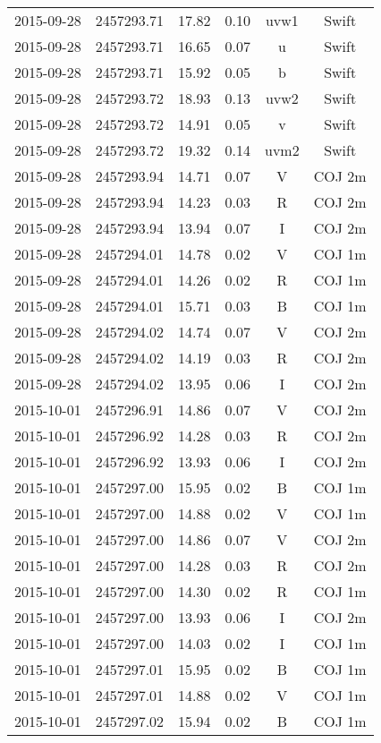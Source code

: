 \begin{table}
\begin{tabular}{cccccc}
2015-09-28 & 2457293.71 & 17.82 & 0.10 & uvw1 & Swift \\
2015-09-28 & 2457293.71 & 16.65 & 0.07 & u & Swift \\
2015-09-28 & 2457293.71 & 15.92 & 0.05 & b & Swift \\
2015-09-28 & 2457293.72 & 18.93 & 0.13 & uvw2 & Swift \\
2015-09-28 & 2457293.72 & 14.91 & 0.05 & v & Swift \\
2015-09-28 & 2457293.72 & 19.32 & 0.14 & uvm2 & Swift \\
2015-09-28 & 2457293.94 & 14.71 & 0.07 & V & COJ 2m \\
2015-09-28 & 2457293.94 & 14.23 & 0.03 & R & COJ 2m \\
2015-09-28 & 2457293.94 & 13.94 & 0.07 & I & COJ 2m \\
2015-09-28 & 2457294.01 & 14.78 & 0.02 & V & COJ 1m \\
2015-09-28 & 2457294.01 & 14.26 & 0.02 & R & COJ 1m \\
2015-09-28 & 2457294.01 & 15.71 & 0.03 & B & COJ 1m \\
2015-09-28 & 2457294.02 & 14.74 & 0.07 & V & COJ 2m \\
2015-09-28 & 2457294.02 & 14.19 & 0.03 & R & COJ 2m \\
2015-09-28 & 2457294.02 & 13.95 & 0.06 & I & COJ 2m \\
2015-10-01 & 2457296.91 & 14.86 & 0.07 & V & COJ 2m \\
2015-10-01 & 2457296.92 & 14.28 & 0.03 & R & COJ 2m \\
2015-10-01 & 2457296.92 & 13.93 & 0.06 & I & COJ 2m \\
2015-10-01 & 2457297.00 & 15.95 & 0.02 & B & COJ 1m \\
2015-10-01 & 2457297.00 & 14.88 & 0.02 & V & COJ 1m \\
2015-10-01 & 2457297.00 & 14.86 & 0.07 & V & COJ 2m \\
2015-10-01 & 2457297.00 & 14.28 & 0.03 & R & COJ 2m \\
2015-10-01 & 2457297.00 & 14.30 & 0.02 & R & COJ 1m \\
2015-10-01 & 2457297.00 & 13.93 & 0.06 & I & COJ 2m \\
2015-10-01 & 2457297.00 & 14.03 & 0.02 & I & COJ 1m \\
2015-10-01 & 2457297.01 & 15.95 & 0.02 & B & COJ 1m \\
2015-10-01 & 2457297.01 & 14.88 & 0.02 & V & COJ 1m \\
2015-10-01 & 2457297.02 & 15.94 & 0.02 & B & COJ 1m \\

\end{tabular}
\end{table}

